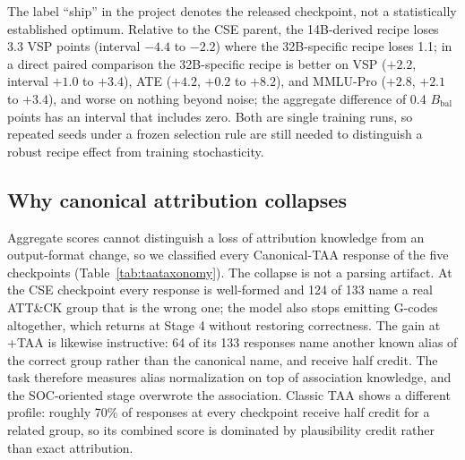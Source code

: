 \documentclass[preprint,12pt,authoryear]{elsarticle}
\newcommand{\Bbal}{B_{\mathrm{bal}}}
\begin{document}
The label ``ship'' in the project denotes the released checkpoint, not a statistically established optimum. Relative to the CSE parent, the 14B-derived recipe loses 3.3 VSP points (interval $-4.4$ to $-2.2$) where the 32B-specific recipe loses 1.1; in a direct paired comparison the 32B-specific recipe is better on VSP ($+2.2$, interval $+1.0$ to $+3.4$), ATE ($+4.2$, $+0.2$ to $+8.2$), and MMLU-Pro ($+2.8$, $+2.1$ to $+3.4$), and worse on nothing beyond noise; the aggregate difference of 0.4 $\Bbal$ points has an interval that includes zero. Both are single training runs, so repeated seeds under a frozen selection rule are still needed to distinguish a robust recipe effect from training stochasticity.

\subsection{Why canonical attribution collapses}\label{sec:cseshard}
Aggregate scores cannot distinguish a loss of attribution knowledge from an output-format change, so we classified every Canonical-TAA response of the five checkpoints (Table~\ref{tab:taataxonomy}). The collapse is not a parsing artifact. At the CSE checkpoint every response is well-formed and 124 of 133 name a real ATT\&CK group that is the wrong one; the model also stops emitting G-codes altogether, which returns at Stage 4 without restoring correctness. The gain at +TAA is likewise instructive: 64 of its 133 responses name another known alias of the correct group rather than the canonical name, and receive half credit. The task therefore measures alias normalization on top of association knowledge, and the SOC-oriented stage overwrote the association. Classic TAA shows a different profile: roughly 70\% of responses at every checkpoint receive half credit for a related group, so its combined score is dominated by plausibility credit rather than exact attribution.
\end{document}
